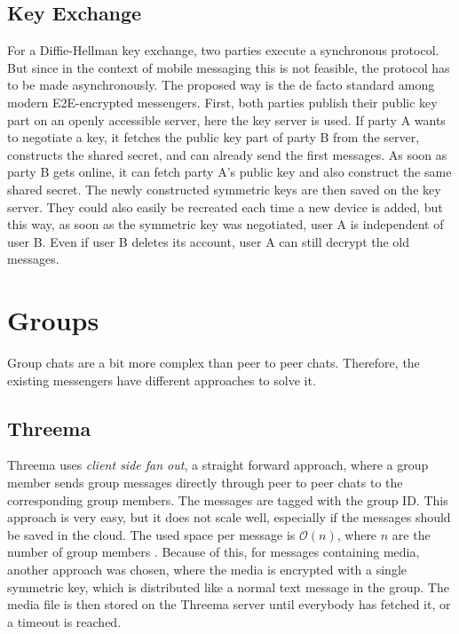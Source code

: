 \documentclass[a4paper, oneside]{discothesis}
\begin{document}
\subsection{Key Exchange}

For a Diffie-Hellman key exchange, two parties execute a synchronous protocol. But since in the context of mobile messaging this is not feasible, the protocol has to be made asynchronously. The proposed way is the de facto standard among modern E2E-encrypted messengers. First, both parties publish their public key part on an openly accessible server, here the key server is used. If party A wants to negotiate a key, it fetches the public key part of party B from the server, constructs the shared secret, and can already send the first messages. As soon as party B gets online, it can fetch party A's public key and also construct the same shared secret. The newly constructed symmetric keys are then saved on the key server. They could also easily be recreated each time a new device is added, but this way, as soon as the symmetric key was negotiated, user A is independent of user B. Even if user B deletes its account, user A can still decrypt the old messages.

\section{Groups}

Group chats are a bit more complex than peer to peer chats. Therefore, the existing messengers have different approaches to solve it.

\subsection{Threema}

Threema uses \emph{client side fan out}, a straight forward approach, where a group member sends group messages directly through peer to peer chats to the corresponding group members. The messages are tagged with the group ID. This approach is very easy, but it does not scale well, especially if the messages should be saved in the cloud. The used space per message is $\mathcal{O}(n)$, where $n$ are the number of group members \cite{Threema}. Because of this, for messages containing media, another approach was chosen, where the media is encrypted with a single symmetric key, which is distributed like a normal text message in the group. The media file is then stored on the Threema server until everybody has fetched it, or a timeout is reached.
\end{document}
